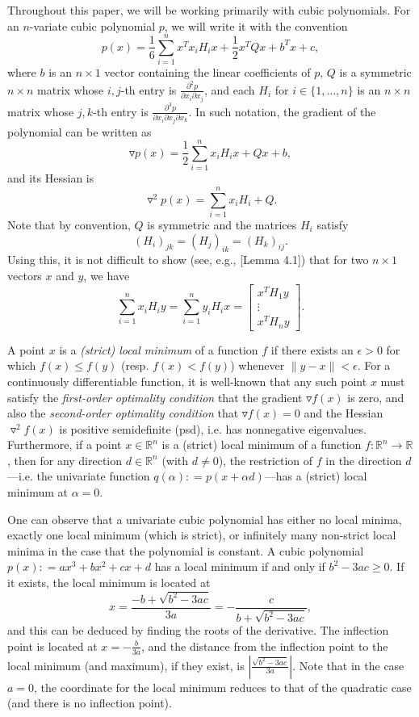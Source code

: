 \documentclass[11pt]{article}
\theoremstyle{plain}
\theoremstyle{definition}
\theoremstyle{remark}
\def \bmat{\left[\begin{matrix}}
\def \emat{\end{matrix}\right]}
\def \defeq{\mathrel{\mathop{:}}=}
\def \grad{\triangledown}
\def \Hess{\triangledown^2}
\def \R{\mathbb{R}}
\def \Rn{\R^n}
\def \beq{\begin{equation}}
\def \eeq{\end{equation}}
\def \otn{\{1, \ldots, n\}}
\begin{document}
Throughout this paper, we will be working primarily with cubic polynomials. For an $n$-variate cubic polynomial $p$, we will write it with the convention
\beq \label{Eq: Cubic Poly Form} p(x) = \frac{1}{6}\sum_{i=1}^n x^T x_iH_ix + \frac{1}{2}x^TQx + b^Tx + c,\eeq
where $b$ is an $n \times 1$ vector containing the linear coefficients of $p$, $Q$ is a symmetric $n \times n$ matrix whose $i,j$-th entry is $\frac{\partial^2 p}{\partial x_i\partial x_j}$, and each $H_i$ for $i \in \otn$  is an $n \times n$ matrix whose $j,k$-th entry is $\frac{\partial^3 p}{\partial x_i \partial x_j \partial x_k}$. In such notation, the gradient of the polynomial can be written as
\beq \label{Eq: Cubic Poly Form Gradient} \grad p(x) = \frac{1}{2}\sum_{i=1}^n x_iH_ix + Qx + b,\eeq
and its Hessian is
\beq \label{Eq: Cubic Poly Form Hessian} \grad^2 p(x) = \sum_{i=1}^n x_iH_i + Q.\eeq
Note that by convention, $Q$ is symmetric and the matrices $H_i$ satisfy
\begin{equation}\label{Eq: Valid Hessian}
(H_i)_{jk} = (H_j)_{ik} = (H_k)_{ij}.
\end{equation}
Using this, it is not difficult to show (see, e.g., \cite{ahmadi2022complexity}[Lemma 4.1]) that for two $n \times 1$ vectors $x$ and $y$, we have
\beq\label{Lem: Hessian switch}\sum_{i=1}^n x_iH_iy = \sum_{i=1}^n y_iH_ix = \bmat x^TH_1y \\ \vdots \\ x^TH_ny \emat.\eeq

A point $x$ is a \emph{(strict) local minimum} of a function $f$ if there exists an $\epsilon > 0$ for which $f(x) \le f(y)$ (resp. $f(x) < f(y)$) whenever $\|y - x\| < \epsilon$. For a continuously differentiable function, it is well-known that any such point $x$ must satisfy the \emph{first-order optimality condition} that the gradient $\grad f(x)$ is zero, and also the \emph{second-order optimality condition} that $\grad f(x) = 0$ and the Hessian $\Hess f(x)$ is positive semidefinite (psd), i.e. has nonnegative eigenvalues. Furthermore, if a point $x \in \Rn$ is a (strict) local minimum of a function $f: \Rn \to \R$, then for any direction $d \in \Rn$ (with $d \ne 0$), the restriction of $f$ in the direction $d$ ---i.e. the univariate function $q(\alpha) \defeq p(x + \alpha d)$---has a (strict) local minimum at $\alpha = 0$.

One can observe that a univariate cubic polynomial has either no local minima, exactly one local minimum (which is strict), or infinitely many non-strict local minima in the case that the polynomial is constant. A cubic polynomial $p(x) \defeq ax^3 + bx^2 + cx + d$ has a local minimum if and only if $b^2 - 3ac \ge 0$. If it exists, the local minimum is located at $$x = \frac{-b + \sqrt{b^2 - 3ac}}{3a} = -\frac{c}{b + \sqrt{b^2 - 3ac}},$$
and this can be deduced by finding the roots of the derivative. The inflection point is located at $x = -\frac{b}{3a}$, and the distance from the inflection point to the local minimum (and maximum), if they exist, is $|\frac{\sqrt{b^2 - 3ac}}{3a}|$. Note that in the case $a = 0$, the coordinate for the local minimum reduces to that of the quadratic case (and there is no inflection point).
\end{document}
